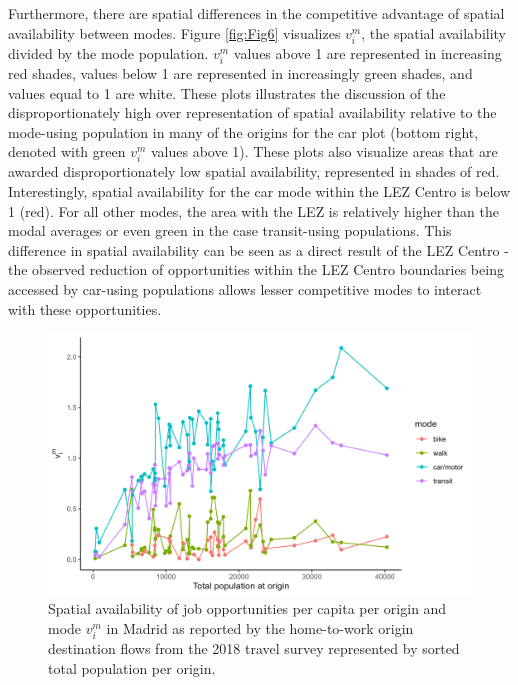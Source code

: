 \documentclass[numbered]{trbunofficial}
\begin{document}
Furthermore, there are spatial differences in the competitive advantage
of spatial availability between modes. Figure \ref{fig:Fig6} visualizes
\(v_i^m\), the spatial availability divided by the mode population.
\(v_i^m\) values above 1 are represented in increasing red shades,
values below 1 are represented in increasingly green shades, and values
equal to 1 are white. These plots illustrates the discussion of the
disproportionately high over representation of spatial availability
relative to the mode-using population in many of the origins for the car
plot (bottom right, denoted with green \(v_i^m\) values above 1). These
plots also visualize areas that are awarded disproportionately low
spatial availability, represented in shades of red. Interestingly,
spatial availability for the car mode within the LEZ Centro is below 1
(red). For all other modes, the area with the LEZ is relatively higher
than the modal averages or even green in the case transit-using
populations. This difference in spatial availability can be seen as a
direct result of the LEZ Centro - the observed reduction of
opportunities within the LEZ Centro boundaries being accessed by
car-using populations allows lesser competitive modes to interact with
these opportunities.

\begin{figure}

{\centering \includegraphics[width=1\linewidth]{images/v_im_per_pop_plot} 

}

\caption{\label{fig:Fig7} Spatial availability of job opportunities per capita per origin and mode $v_i^m$ in Madrid as reported by the home-to-work origin destination flows from the 2018 travel survey represented by sorted total population per origin.}\label{fig:SA-per-capita-m-linear-plot}
\end{figure}
\end{document}
